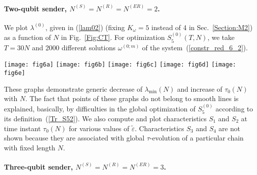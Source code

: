 \documentclass[pra,preprint,showpacs]{revtex4-1}
\begin{document}
{{\paragraph{Two-qubit sender, $N^{(S)}=N^{(R)}=N^{(ER)}=2$.}
We plot  $\lambda^{(0)}$, given in (\ref{lam02})  (fixing $K_\omega=5$ instead of 4 in Sec.~\ref{Section:M2}) as a function of $N$ in Fig.~\ref{Fig:CT}. For optimization  $S_5^{(0)}(T,N)$, we take $T=30 N$ and 2000 different solutions $\omega^{(0;m)}$ of the system~(\ref{constr_red_6_2}).
\begin{figure*}[!]
\centering
  \texttt{[image: fig6a]}
  \texttt{[image: fig6b]}
  \texttt{[image: fig6c]}
  \texttt{[image: fig6d]}
  \texttt{[image: fig6e]}
\caption{$N^{(S)}=N^{(R)}=2$; the scale factor $\lambda^{(0)}(N)=S_5^{(0)}(\tau_0,N)$,
$0\le \tau_0(N) \le 30 N$, (a) and the corresponding  time instant $\tau_0(N)$ (b)  as  functions of the chain length $N$; optimization is over 2000 solutions of Eq.~(\ref{constr_red_6_2}). {Characteristics $S_1$ and $S_2$ at time instant $\tau_0(N)$ for different values of parameter $\tilde\varepsilon$ are shown, respectively,  in (c) and (d), also for even values of $N$. Graphics of $S_1$ and $S_2$ for $\tilde\varepsilon=0.00001$ are shown in (e) }
}
  \label{Fig:CT}
\end{figure*}
These graphs demonstrate generic decrease of $\lambda_{\min}(N)$ and increase of $\tau_0(N)$ with $N$. The fact that points of these graphs do not belong to smooth lines is explained, basically, by difficulties in the global optimization  of $S^{(0)}_5$ according to its definition~(\ref{Tr_S52}). {We also compute and plot characteristics $S_1$ and $S_2$ at time instant $\tau_0(N)$ for various values of $\tilde\varepsilon$. Characteristics $S_3$ and $S_4$ are not shown because they are  associated with global $\tau$-evolution of a particular chain with fixed length $N$.}


\paragraph{Three-qubit sender, $N^{(S)}=N^{(R)}=N^{(ER)}=3$.}
\label{Section:NnS3}

}}
\end{document}
